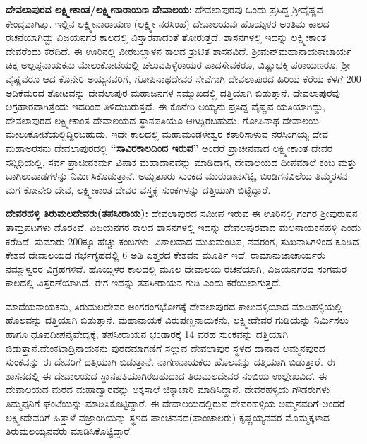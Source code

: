 \textbf{ದೇವಲಾಪುರದ ಲಕ್ಷ್ಮೀಕಾಂತ/ಲಕ್ಷ್ಮೀನಾರಾಯಣ ದೇವಾಲಯ:} ದೇವಲಾಪುರವು ಒಂದು ಪ್ರಸಿದ್ಧ ಶ‍್ರೀವೈಷ್ಣವ ಕೇಂದ್ರವಾಗಿತ್ತು. ಇಲ್ಲಿನ ಲಕ್ಷ್ಮೀನಾರಾಯಣ (ಲಕ್ಷ್ಮೀ ನರಸಿಂಹ) ದೇವಾಲಯವು ಹೊಯ್ಸಳರ ಅಂತಿಮ ಕಾಲದ ರಚನೆಯಾಗಿದ್ದು ವಿಜಯನಗರ ಕಾಲದಲ್ಲಿ ವಿಸ್ತಾರವಾದಂತೆ ತೋರುತ್ತದೆ. ಶಾಸನಗಳಲ್ಲಿ ಇದನ್ನು ಲಕ್ಷ್ಮೀಕಾಂತ ದೇವರೆಂದು ಕರೆದಿದೆ. ಈ ಊರಿನಲ್ಲಿ ವೀರಬಲ್ಲಾಳನ ಕಾಲದ ತ್ರುಟಿತ ಶಾಸನವಿದೆ. ಶ‍್ರೀಮನ್​ ಮಹಾನಾಯಕಾಚಾರ್ಯ ಚಿಕ್ಕ ಅಲ್ಲಪ್ಪನಾಯಕನು ಮೇಲುಕೋಟೆಯಲ್ಲಿ ಚೆಲುವಪಿಳ್ಳೆರಾಯರ ಪಾದಸೇವಕರೂ, ವಿಷ್ಣುಭಕ್ತಿ ಪರಾಯಣರೂ, ಶ‍್ರೀ ವೈಷ್ಣವರೂ ಆದ ಕೊನೇರಿ ಅಯ್ಯನವರಿಗೆ, ಗೋಪಿನಾಥದೇವರ ಸೇವೆಗಾಗಿ ದೇವಲಾಪುರದ ಹಿರಿಯ ಕೆರೆಯ ಕೆಳಗೆ 200 ಅಡಿಕೆಮರದ ತೋಟವನ್ನು ದೇವಲಾಪುರ ಮಹಾಜನಗಳ ಸಮ್ಮುಖದಲ್ಲಿ ದತ್ತಿಯಾಗಿ ಬಿಡುತ್ತಾನೆ. ದೇವಲಾಪುರವು ಅಗ್ರಹಾರವಾಗಿತ್ತೆಂದು ಇದರಿಂದ ತಿಳಿದುಬರುತ್ತದೆ. ಈ ಕೊನೇರಿ ಅಯ್ಯನು ಪ್ರಸಿದ್ದ ವೈಷ್ಣವ ಯತಿಯಾಗಿದ್ದು, ದೇವಲಾಪುರದ ಲಕ್ಷ್ಮೀಕಾಂತ ದೇವಾಲಯದ ಸ್ಥಾನಪತಿಯೂ ಆಗಿದ್ದಿರಬಹುದು. ಗೋಪಿನಾಥ ದೇವಾಲಯ ಮೇಲುಕೋಟೆಯಲ್ಲಿದ್ದಿರಬಹುದು. ಇದೇ ಕಾಲದಲ್ಲಿ ಮಹಾಮಂಡಳೇಶ್ವರ ಕಠಾರಿಸಾಳುವ ನರಸಿಂಗಯ್ಯ ದೇವ ಮಹಾಅರಸನು ದೇವಲಾಪುರದಲ್ಲಿ \textbf{“ಸಾವಿರಕಾಲದಿಂದ ಇರುವ”} ಅಂದರೆ ಪ್ರಾಚೀನವಾದ ಲಕ್ಷ್ಮೀಕಾಂತ ದೇವರ ಸನ್ನಿಧಿಯಲ್ಲಿ, ಸರ್ವ ಪ್ರಾಚೀನಕರ್ಮ ವಿಪಾಕ ಮಹಾದಾನವನ್ನು ಮಾಡಿದಾಗ, ದೇವಾಲಯದ ದೀಪಮಾಲೆ ಕಂಬ ಮತ್ತು ಬಾಗಿಲುವಾಡಗಳನ್ನು ನಿರ್ಮಿಸಿಕೊಡುತ್ತಾನೆ. ಅಮೃತೂರು ಸುಂಕದ ಮುರುಡಾನಸೆಟ್ಟಿ, ಬಿಂಡಿಗನವಿಲೆಯ ತಿಮ್ಮರಸನ ಮಗ ಕೋನೇರಿ ದೇವ, ಲಕ್ಷ್ಮೀಕಾಂತ ದೇವರ ವಸ್ತ್ರಕ್ಕೆ ಸುಂಕಗಳನ್ನು ದತ್ತಿಯಾಗಿ ಬಿಟ್ಟಿದ್ದಾರೆ.

\textbf{ದೇವರಹಳ್ಳಿ ತಿರುಮಲದೇವರು(ತಪಸೀರಾಯ):} ದೇವಲಾಪುರದ ಸಮೀಪ ಇರುವ ಈ ಊರಿನಲ್ಲಿ ಗಂಗರ ಶ‍್ರೀಪುರುಷನ ತಾಮ್ರಪಟಗಳು ದೊರಕಿವೆ. ವಿಜಯನಗರ ಕಾಲದ ಶಾಸನಗಳಲ್ಲಿ ಇದನ್ನು ದೇವಲಪುರವಾದ ಮಲನಾಯಕನಹಳ್ಳಿ ಎಂದು ಕರೆದಿದೆ. ಸುಮಾರು 200ಕ್ಕೂ ಹೆಚ್ಚು ಕಂಬಗಳು, ವಿಶಾಲವಾದ ಮುಖಮಂಟಪ, ನವರಂಗ, ಸುಖನಾಸಿಗಳಿಂದ ಕೂಡಿದ ಕೇಶವ ದೇವಾಲಯದ ಗರ್ಭಗೃಹದಲ್ಲಿ 6 ಅಡಿ ಎತ್ತರದ ಕೇಶವನ ಮೂರ್ತಿ ಇದೆ. ರಾಮಾನುಜಾಚಾರ್ಯರು ನಮ್ಮಾಳ್ವರರ ವಿಗ್ರಹಗಳಿವೆ. ಹೊಯ್ಸಳರ ಕಾಲದಲ್ಲಿ ಮೂಲ ದೇವಾಲಯ ರಚನೆಯಾಗಿ, ವಿಜಯನಗರದ ಸಂಗಮರ ಕಾಲದಲ್ಲಿ ವಿಸ್ತರಣೆಯಾಗಿದೆ. ಈಗ ಇದನ್ನು ತಪಸೀರಾಯನ ಗುಡಿ ಎಂದು ಕರೆಯಲಾಗುತ್ತದೆ.

ಮಾದೆಯನಾಯಕನು, ತಿರುಮಲದೇವರ ಅಂಗರಂಗಭೋಗಕ್ಕೆ ದೇವಲಾಪುರದ ಕಾಲುವಳ್ಳಿಯಾದ ಮಾದಿಹಳ್ಳಿಯಲ್ಲಿ ಹೊಲವನ್ನು ದತ್ತಿಯಾಗಿ ಬಿಡುತ್ತಾನೆ. ಮಹಾನಾಯಕ ವಿರುಪಣ್ಣನಾಯಕನು, ಲಕ್ಷ್ಮೀದೇವರ ಗುಡಿಯನ್ನು ನಿರ್ಮಿಸಲು ಹಾಗೂ ಧೂಪದೀಪನೈವೇದ್ಯಕ್ಕೆ, ತಪಸೀರಾಯನ ಭಂಡಾರಕ್ಕೆ 14 ವರಹ ಸುಂಕವನ್ನು ದತ್ತಿಯಾಗಿ ಬಿಡುತ್ತಾನೆ.\break ವೇಂಕಟಾದ್ರಿನಾಯಕನು ಪುರದಮಾಗಣಿಗೆ ಸಲ್ಲುವ ದೇವಲಾಪುರ ಸ್ಥಳದ ದಾನಾದ ಅಮ್ಮನಪುರದ ಸುಂಕವನ್ನು ಈ ದೇವರಿಗೆ ದತ್ತಿಯಾಗಿ ಬಿಡುತ್ತಾನೆ. ನಾಗಣನಾಯಕರು ಹೊಲವನ್ನು ದತ್ತಿಯಾಗಿ ಬಿಡುತ್ತಾರೆ. ಈ ಶಾಸನದಲ್ಲಿ ಈ ದೇವಾಲಯದ ಸ್ಥಾನಪತಿಯಾಗಿರಬಹುದಾದ ತಿರುಮಲದೇವರ ನಂಬಿಯ ಉಲ್ಲೇಖವಿದೆ. ಈ ದೇವಾಲಯದ ಮರದ ಮಹಾದ್ವಾರವನ್ನು ಅಕ್ಕಸಾಲೆ ಚಿಕ್ಕಾಚಾರಿ ಮಾಡಿಸಿದ್ದಾನೆ. ದೇವರಹಳ್ಳಿಯ ಗೌಡರುಗಳು ತಿಮ್ಮಪ್ಪನಿಗೆ ಘಂಟೆಯನ್ನು ಮಾಡಿಸಿಕೊಟ್ಟಿದ್ದಾರೆ. ಈ ದೇವಾಲಯದಲ್ಲಿರುವ ದೇವರಹಳ್ಳಿಯ ಅಮ್ಮನವರಿಗೆ ಅಂದರೆ ಲಕ್ಷ್ಮೀದೇವರಿಗೆ ಹಿತ್ತಾಳೆ ವಜ್ರಾಂಗಿಯನ್ನು ಸ್ಥಳದ ಪಾಂಚನನದ(ಪಾಂಚಾಲರು) ಕೃಷ್ಣಯ್ಯನವರ ಮೊಮ್ಮಕ್ಕಳಾದ ತಿರುಮಲಯ್ಯನವರು ಮಾಡಿಸಿಕೊಟ್ಟಿದ್ದಾರೆ.

